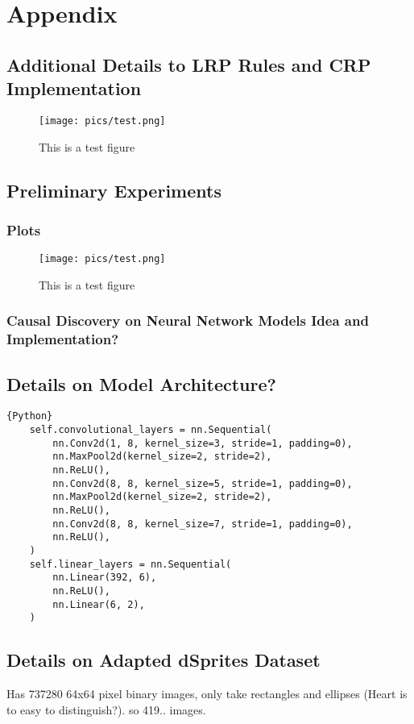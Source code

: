 \chapter{Appendix}\label{chapter:Appendix}


\section{Additional Details to LRP Rules and CRP Implementation}
\label{appendix:lrprules}
\begin{figure}[ht]
	\centering
	\label{fig:tesfigure}
	\texttt{[image: pics/test.png]}
	\caption[Test Figure]{This is a test figure}
\end{figure}

\section{Preliminary Experiments}
\subsection{Plots}
\begin{figure}[ht]
	\centering
	\label{fig:blafigure}
	\texttt{[image: pics/test.png]}
	\caption[Test Figure 2]{This is a test figure}
\end{figure}
\subsection{Causal Discovery on Neural Network Models Idea and Implementation?}


\section{Details on Model Architecture?}

\begin{lstlisting}{Python}
	self.convolutional_layers = nn.Sequential(
		nn.Conv2d(1, 8, kernel_size=3, stride=1, padding=0),
		nn.MaxPool2d(kernel_size=2, stride=2),
		nn.ReLU(),
		nn.Conv2d(8, 8, kernel_size=5, stride=1, padding=0),
		nn.MaxPool2d(kernel_size=2, stride=2),
		nn.ReLU(),
		nn.Conv2d(8, 8, kernel_size=7, stride=1, padding=0),
		nn.ReLU(),
	)
	self.linear_layers = nn.Sequential(
		nn.Linear(392, 6),
		nn.ReLU(),
		nn.Linear(6, 2),
	)
\end{lstlisting}

\section{Details on Adapted dSprites Dataset}\label{appendix:dsprites}
Has 737280 64x64 pixel binary images, only take rectangles and ellipses (Heart is to easy to distinguish?). so 419.. images.

